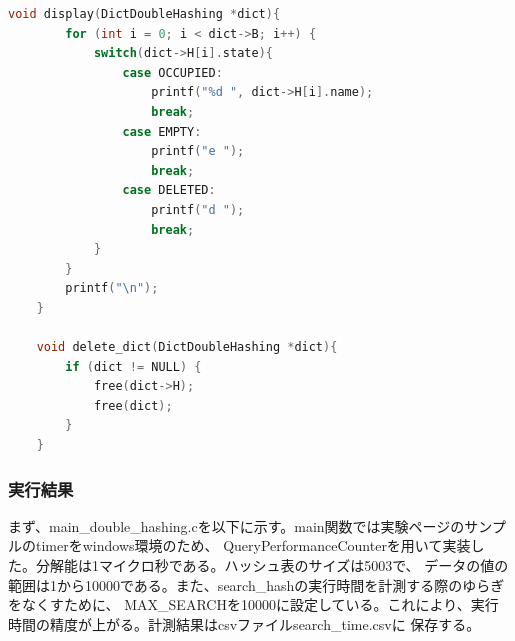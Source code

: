 \documentclass{ltjsarticle}
\begin{document}
\begin{lstlisting}[caption=double\_hashing.cの主要部, label=code:two, language=C,captionpos = b]
    void display(DictDoubleHashing *dict){
        for (int i = 0; i < dict->B; i++) {
            switch(dict->H[i].state){
                case OCCUPIED:
                    printf("%d ", dict->H[i].name);
                    break;
                case EMPTY:
                    printf("e ");
                    break;
                case DELETED:
                    printf("d ");
                    break;
            }
        }
        printf("\n");
    }
    
    void delete_dict(DictDoubleHashing *dict){
        if (dict != NULL) {
            free(dict->H);
            free(dict);
        }
    }
\end{lstlisting}
\subsubsection{実行結果}\label{subsubsec:実行結果3}
まず、main\_double\_hashing.cを以下に示す。main関数では実験ページのサンプルのtimerをwindows環境のため、
QueryPerformanceCounterを用いて実装した。分解能は1マイクロ秒である。ハッシュ表のサイズは5003で、
データの値の範囲は1から10000である。また、search\_hashの実行時間を計測する際のゆらぎをなくすために、
MAX\_SEARCHを10000に設定している。これにより、実行時間の精度が上がる。計測結果はcsvファイルsearch\_time.csvに
保存する。
\end{document}
